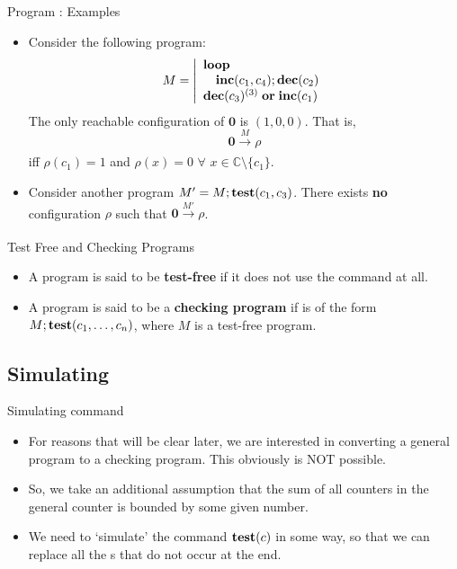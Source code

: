 \documentclass{beamer}
\renewcommand{\b}[1]{\boldsymbol{#1}}
\newcommand{\zero}[0]{\b{0}}
\newcommand{\test}[0]{\text{\rmfamily{\textbf{test}}}}
\newcommand{\inc}[0]{\text{\rmfamily{\textbf{inc}}}}
\newcommand{\dec}[0]{\text{\rmfamily{\textbf{dec}}}}
\newcommand{\lo}[0]{\text{\rmfamily{\textbf{loop}}}}
\newcommand{\Or}[0]{\text{\rmfamily{\textbf{or}}}}
\newcommand{\prog}[1]{\xrightarrow[]{#1}}
\begin{document}
\begin{frame}{Program : Examples}
\begin{itemize}
    \item Consider the following program:
$$M = \left\vert \begin{array}{l}
     \lo \\
     \quad \inc(c_1,c_4);\dec(c_2) \\
    \dec(c_3)^{(3)} \;\Or\; \inc(c_1) \\
\end{array} \right. $$
\pause
The only reachable configuration of $\zero$ is $(1,0,0)$. That is,
$$\zero \prog{M} \rho $$
iff $\rho(c_1) = 1$ and $\rho(x) = 0$ $\forall$ $x \in \mathbb{C}\setminus \{c_1\}$.
\pause
\item Consider another program $M' = M;\test(c_1,c_3)$. There exists \textbf{no} configuration $\rho$ such that $\zero \prog{M'} \rho$.
\end{itemize}



\end{frame}


\begin{frame}{Test Free and Checking Programs}
    \begin{itemize}
        \item A program is said to be \textbf{test-free} if it does not use the \test{} command at all.
        \vfill
        \item A program is said to be a \textbf{checking program} if is of the form $M;\test(c_1,\dots,c_n)$, where $M$ is a test-free program.
    \end{itemize}
\end{frame}

\subsection{Simulating }

\begin{frame}{Simulating  command}
    \begin{itemize}
        \item For reasons that will be clear later, we are interested in converting a general program to a checking program. This obviously is NOT possible. 
        \item So, we take an additional assumption that the sum of all counters in the general counter is bounded by some given number.
        \item We need to `simulate' the command $\test(c)$  in some way, so that we can replace all the \test s that do not occur at the end.
        
    \end{itemize}
    
\end{frame}
\end{document}
